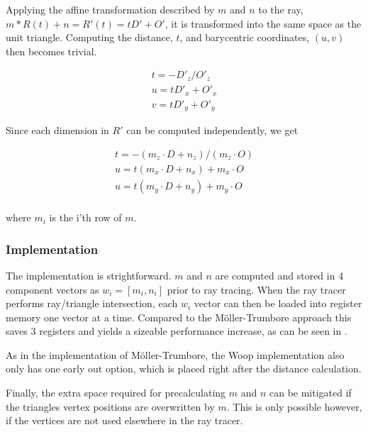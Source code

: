 Applying the affine transformation described by $m$ and $n$ to the
ray, $m * R(t) + n = R'(t) = tD' + O'$, it is transformed into the
same space as the unit triangle. Computing the distance, $t$, and
barycentric coordinates, $(u,v)$ then becomes trivial.

\begin{displaymath}
  \begin{array}{l}
    t = - D'_z / O'_z \\
    u = t D'_x + O'_x \\
    v = t D'_y + O'_y
  \end{array}
\end{displaymath}

Since each dimension in $R'$ can be computed independently, we get 

\begin{displaymath}
  \begin{array}{l}
    t = - (m_z \cdot D + n_z) / (m_z \cdot O) \\
    u = t (m_x \cdot D + n_x) + m_x \cdot O \\
    u = t (m_y \cdot D + n_y) + m_y \cdot O \\
  \end{array}
\end{displaymath}

where $m_i$ is the i'th row of $m$.

\subsubsection{Implementation}

The implementation is strightforward. $m$ and $n$ are computed and
stored in 4 component vectors as $w_i = \left[m_i, n_i \right]$ prior
to ray tracing. When the ray tracer performs ray/triangle
intersection, each $w_i$ vector can then be loaded into register
memory one vector at a time. Compared to the Möller-Trumbore approach
this saves 3 registers and yields a sizeable performance increase, as
can be seen in .


As in the implementation of Möller-Trumbore, the Woop implementation
also only has one early out option, which is placed right after the
distance calculation.


Finally, the extra space required for precalculating $m$ and $n$ can
be mitigated if the triangles vertex positions are overwritten by
$m$. This is only possible however, if the vertices are not used
elsewhere in the ray tracer.


